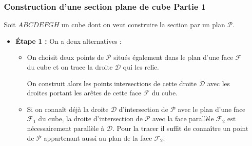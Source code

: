 \documentclass[xcolor=svgnames,t,final]{beamer}
\begin{document}
\begin{frame}

\label{exemple3}

\frametitle{Construction d'une section plane de cube Partie 1 }

\begin{block}



Soit $ABCDEFGH$ un cube dont on veut construire la section par un plan $\mathcal{P}$.

\begin{itemize}
	\item \textbf{Étape 1 :} On a deux alternatives :
	
	\begin{itemize}
\pause	\item On choisit deux points de $\mathcal{P}$ situés également   dans le plan d'une face   $\mathcal{F}$ du cube et on trace la droite $\mathcal{D}$ qui les relie.
	
	On construit alors les points intersections de cette droite $\mathcal{D}$ avec les droites portant les  arêtes de cette face  $\mathcal{F}$   du cube.
 
	\pause \item Si on connaît déjà la droite $\mathcal{D}$  d'intersection de $\mathcal{P}$ avec le plan d'une face $ \mathcal{F}_{1}$  du cube, la droite d'intersection de $\mathcal{P}$  avec la face parallèle $\mathcal{F}_{2}$  est nécessairement parallèle à $\mathcal{D}$. Pour la tracer il suffit de connaître un point de $\mathcal{P}$  appartenant aussi au plan de la face $\mathcal{F}_{2}$. 
	
	\end{itemize}
	
\end{itemize}
\end{block}


\end{frame}
\end{document}
